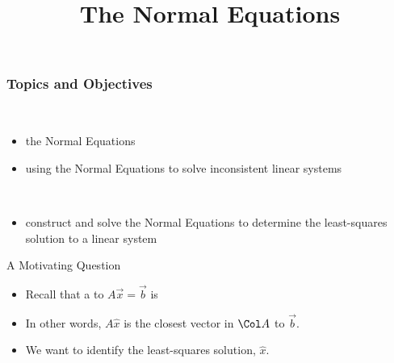 \title{The Normal Equations}
\subtitle{\SubTitleName}
\institute[]{\Course}
\author{\Instructor}
\maketitle   


\begin{frame}\frametitle{Topics and Objectives}
 \\
\begin{itemize}

    \item the Normal Equations 
    \item using the Normal Equations to solve inconsistent linear systems 
    
\end{itemize}

\vspace{0.5cm}

\\

\begin{itemize}

    \item construct and solve the Normal Equations to determine the least-squares solution to a linear system
  
\end{itemize}

\vspace{0.25cm} 
 
 \end{frame}

\begin{frame}{A Motivating Question}

    \begin{itemize}\setlength{\itemsep}{8pt}
        \item Recall that a  to $ A \vec x = \vec b$ is   
        \item<4->{In other words, $ A\widehat x $ is the closest vector in $\Col A$ to $\vec b$.  }
        \item<5-> We want to identify the least-squares solution, $\widehat x $.
    \end{itemize}
\end{frame}




